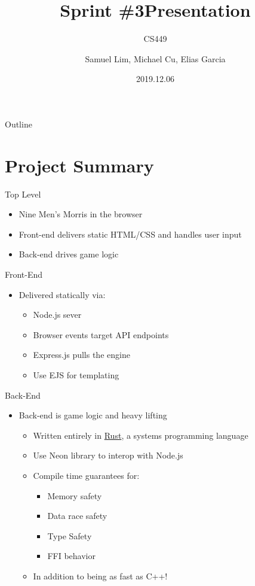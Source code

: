 \documentclass[allowframebreaks]{beamer}
\author{Samuel Lim, Michael Cu, Elias Garcia}
\date{2019.12.06}
\title{Sprint \#3Presentation}
\subtitle{CS449}
\begin{document}
\maketitle
\begin{frame}{Outline}
\tableofcontents
\end{frame}

\section{Project Summary}
\label{sec:orgb8f1dd0}
\begin{frame}[label={sec:orgcde1358}]{Top Level}
\begin{itemize}
\item Nine Men's Morris in the browser
\item Front-end delivers static HTML/CSS and handles user input
\item Back-end drives game logic
\end{itemize}
\end{frame}
\begin{frame}[label={sec:orgc77ff86}]{Front-End}
\begin{itemize}
\item Delivered statically via:
\begin{itemize}
\item Node.js sever
\item Browser events target API endpoints
\item Express.js pulls the engine
\item Use EJS for templating
\end{itemize}
\end{itemize}
\end{frame}
\begin{frame}[label={sec:org464cedc}]{Back-End}
\begin{itemize}
\item Back-end is game logic and heavy lifting
\begin{itemize}
\item Written entirely in \href{https://www.rust-lang.org/}{Rust}, a systems programming language
\item Use Neon library to interop with Node.js
\item Compile time guarantees for:
\begin{itemize}
\item Memory safety
\item Data race safety
\item Type Safety
\item FFI behavior
\end{itemize}
\item In addition to being as fast as C++!
\end{itemize}
\end{itemize}
\end{frame}
\end{document}
